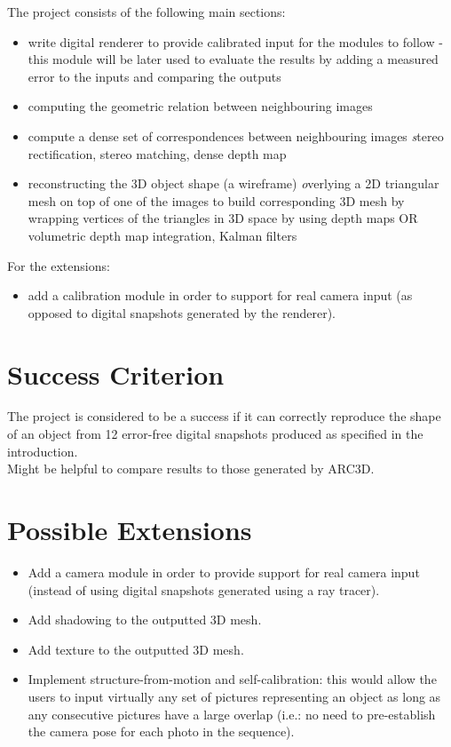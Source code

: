 The project consists of the following main sections:
\begin{itemize}
\item write digital renderer to provide calibrated input for the modules to follow - this module will be later used to evaluate the results by adding a measured error to the inputs and comparing the outputs
\item computing the geometric relation between neighbouring images
\item compute a dense set of correspondences between neighbouring images
{\emph stereo rectification, stereo matching, dense depth map}
\item reconstructing the 3D object shape (a wireframe)
{\emph overlying a 2D triangular mesh on top of one of the images to build corresponding 3D mesh by wrapping vertices of the triangles in 3D space by using depth maps OR volumetric depth map integration, Kalman filters}
\end{itemize}
For the extensions:
\begin{itemize}
\item add a calibration module in order to support for real camera input (as opposed to digital snapshots generated by the renderer).  
\end{itemize}

\section*{Success Criterion}
The project is considered to be a success if it can correctly reproduce the shape of an object from 12 error-free digital snapshots produced as specified in the introduction.\\ 

 Might be helpful to compare results to those generated by ARC3D.
 
\section*{Possible Extensions}
\begin{itemize}
\item Add a camera module in order to provide support for real camera input (instead of using digital snapshots generated using a ray tracer).
\item Add shadowing to the outputted 3D mesh. 
\item Add texture to the outputted 3D mesh.
\item Implement structure-from-motion and self-calibration: this would allow the users to input virtually any set of pictures representing an object as long as any consecutive pictures have a large overlap (i.e.: no need to pre-establish the camera pose for each photo in the sequence).
\end{itemize}

